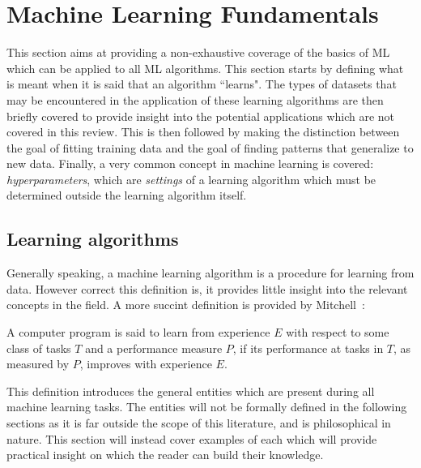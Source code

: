 \section{Machine Learning Fundamentals}
This section aims at providing a non-exhaustive coverage of the basics of
\gls{ML} which can be applied to all \gls{ML} algorithms. This section starts by
defining what is meant when it is said that an algorithm ``learns". The types of
datasets that may be encountered in the application of these learning algorithms
are then briefly covered to provide insight into the potential applications
which are not covered in this review. This is then followed by making the
distinction between the goal of fitting training data and the goal of finding
patterns that generalize to new data. Finally, a very common concept in machine
learning is covered: \textit{hyperparameters}, which are \textit{settings} of a
learning algorithm which must be determined outside the learning algorithm
itself.

\subsection{Learning algorithms\label{ssec:learning_algo}}
Generally speaking, a machine learning algorithm is a procedure for learning
from data. However correct this definition is, it provides little insight into
the relevant concepts in the field. A more succint definition is provided by
Mitchell~\cite{Mitchell97LearningAlgorithm}:

\begin{fancyquotes}
    A computer program is said to learn from experience $E$ with respect
    to some class of tasks $T$ and a performance measure $P$, if its performance
    at tasks in $T$, as measured by $P$, improves with experience $E$.
\end{fancyquotes}

This definition introduces the general entities which are present during all
machine learning tasks. The entities will not be formally defined in the
following sections as it is far outside the scope of this literature, and is
philosophical in nature. This section will instead cover examples of each which
will provide practical insight on which the reader can build their knowledge.

